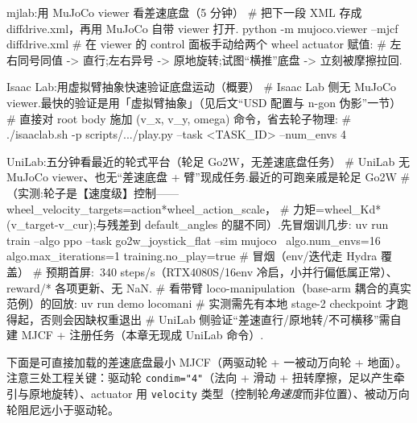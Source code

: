 \begin{codebox}[bash]{mjlab:用 MuJoCo viewer 看差速底盘（5 分钟）}
# 把下一段 XML 存成 diffdrive.xml，再用 MuJoCo 自带 viewer 打开.
python -m mujoco.viewer --mjcf diffdrive.xml
# 在 viewer 的 control 面板手动给两个 wheel actuator 赋值:
#   左右同号同值 -> 直行;左右异号 -> 原地旋转;试图“横推”底盘 -> 立刻被摩擦拉回.
\end{codebox}

\begin{codebox}[Python]{Isaac Lab:用虚拟臂抽象快速验证底盘运动（概要）}
# Isaac Lab 侧无 MuJoCo viewer.最快的验证是用「虚拟臂抽象」（见后文“USD 配置与 n-gon 伪影”一节）
# 直接对 root body 施加 (v_x, v_y, omega) 命令，省去轮子物理:
# ./isaaclab.sh -p scripts/.../play.py --task <TASK_ID> --num_envs 4
\end{codebox}

\begin{codebox}[bash]{UniLab:五分钟看最近的轮式平台（轮足 Go2W，无差速底盘任务）}
# UniLab 无 MuJoCo viewer、也无“差速底盘 + 臂”现成任务.最近的可跑亲戚是轮足 Go2W
# （实测:轮子是【速度级】控制——wheel_velocity_targets=action*wheel_action_scale，
#  力矩=wheel_Kd*(v_target-v_cur);与残差到 default_angles 的腿不同）.先冒烟训几步:
uv run train --algo ppo --task go2w_joystick_flat --sim mujoco \
    algo.num_envs=16 algo.max_iterations=1 training.no_play=true   # 冒烟（env/迭代走 Hydra 覆盖）
# 预期首屏:~340 steps/s（RTX4080S/16env 冷启，小并行偏低属正常）、reward/* 各项更新、无 NaN.
# 看带臂 loco-manipulation（base-arm 耦合的真实范例）的回放:
uv run demo locomani        # 实测需先有本地 stage-2 checkpoint 才跑得起，否则会因缺权重退出
# UniLab 侧验证“差速直行/原地转/不可横移”需自建 MJCF + 注册任务（本章无现成 UniLab 命令）.
\end{codebox}

下面是可直接加载的差速底盘最小 MJCF（两驱动轮 + 一被动万向轮 + 地面）。注意三处工程关键：驱动轮 \verb|condim="4"|（法向 + 滑动 + 扭转摩擦，足以产生牵引与原地旋转）、actuator 用 \verb|velocity| 类型（控制轮\emph{角速度}而非位置）、被动万向轮阻尼远小于驱动轮。

